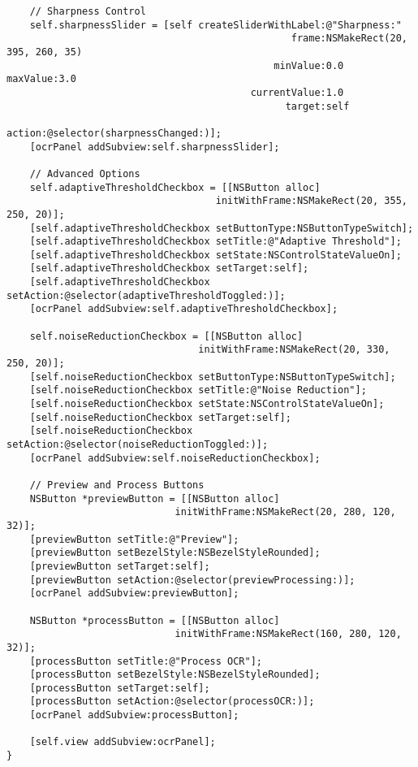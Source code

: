 \begin{verbatim}
    // Sharpness Control
    self.sharpnessSlider = [self createSliderWithLabel:@"Sharpness:" 
                                                 frame:NSMakeRect(20, 395, 260, 35)
                                              minValue:0.0 maxValue:3.0 
                                          currentValue:1.0
                                                target:self
                                                action:@selector(sharpnessChanged:)];
    [ocrPanel addSubview:self.sharpnessSlider];
    
    // Advanced Options
    self.adaptiveThresholdCheckbox = [[NSButton alloc] 
                                    initWithFrame:NSMakeRect(20, 355, 250, 20)];
    [self.adaptiveThresholdCheckbox setButtonType:NSButtonTypeSwitch];
    [self.adaptiveThresholdCheckbox setTitle:@"Adaptive Threshold"];
    [self.adaptiveThresholdCheckbox setState:NSControlStateValueOn];
    [self.adaptiveThresholdCheckbox setTarget:self];
    [self.adaptiveThresholdCheckbox setAction:@selector(adaptiveThresholdToggled:)];
    [ocrPanel addSubview:self.adaptiveThresholdCheckbox];
    
    self.noiseReductionCheckbox = [[NSButton alloc] 
                                 initWithFrame:NSMakeRect(20, 330, 250, 20)];
    [self.noiseReductionCheckbox setButtonType:NSButtonTypeSwitch];
    [self.noiseReductionCheckbox setTitle:@"Noise Reduction"];
    [self.noiseReductionCheckbox setState:NSControlStateValueOn];
    [self.noiseReductionCheckbox setTarget:self];
    [self.noiseReductionCheckbox setAction:@selector(noiseReductionToggled:)];
    [ocrPanel addSubview:self.noiseReductionCheckbox];
    
    // Preview and Process Buttons
    NSButton *previewButton = [[NSButton alloc] 
                             initWithFrame:NSMakeRect(20, 280, 120, 32)];
    [previewButton setTitle:@"Preview"];
    [previewButton setBezelStyle:NSBezelStyleRounded];
    [previewButton setTarget:self];
    [previewButton setAction:@selector(previewProcessing:)];
    [ocrPanel addSubview:previewButton];
    
    NSButton *processButton = [[NSButton alloc] 
                             initWithFrame:NSMakeRect(160, 280, 120, 32)];
    [processButton setTitle:@"Process OCR"];
    [processButton setBezelStyle:NSBezelStyleRounded];
    [processButton setTarget:self];
    [processButton setAction:@selector(processOCR:)];
    [ocrPanel addSubview:processButton];
    
    [self.view addSubview:ocrPanel];
}
\end{verbatim}

